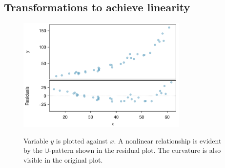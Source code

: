 

\D{\newpage}

\subsection{Transformations to achieve linearity}

\begin{figure}[ht]
   \begin{center}
   \includegraphics[width=0.75\textwidth]{ch_regr_simple_linear/figures/NeedsTransform/NeedsTransform-PreTransform}
\label{pretransform}
   \caption{Variable $y$ is plotted against $x$. A nonlinear relationship is evident by the $\cup$-pattern shown in the residual plot.  The curvature is also visible in the original plot.}
   \label{NeedsTransform-PreTransform}
\end{center}
\end{figure}


